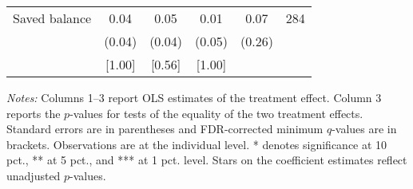 \begin{table}[h]
{\begin{threeparttable}
\begin{tabular}{l*{5}{c}}
Saved balance&     0.04&     0.05&     0.01&     0.07&      284\\
          &   (0.04)&   (0.04)&   (0.05)&   (0.26)&         \\
          &   [1.00]&   [0.56]&   [1.00]&         &         \\
\bottomrule \end{tabular} \begin{tablenotes}[flushleft] \footnotesize \item \emph{Notes:} Columns 1--3 report OLS estimates of the treatment effect. Column 3 reports the \(p\)-values for tests of the equality of the two treatment effects. Standard errors are in parentheses and FDR-corrected minimum \(q\)-values are in brackets. Observations are at the individual level. * denotes significance at 10 pct., ** at 5 pct., and *** at 1 pct. level. Stars on the coefficient estimates reflect unadjusted \(p\)-values. \end{tablenotes} \end{threeparttable} } \end{table}

